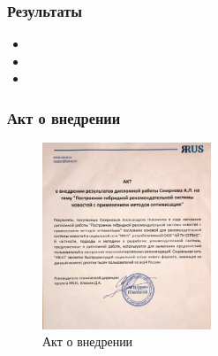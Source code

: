 \documentclass[xetex,mathserif,serif]{beamer}
\begin{document}
\begin{frame}
	\frametitle{Результаты}
	\begin{itemize}
		\item 
		\item 
		\item 
	\end{itemize}
\end{frame}


\begin{frame}
	\frametitle{Акт о внедрении}

    \begin{figure}[h]
        \includegraphics[width=0.45\textwidth]{./images/akt.jpg}
        \caption{Акт о внедрении}
        \label{fig:akt}
        \centering
    \end{figure}

\end{frame}
\end{document}
